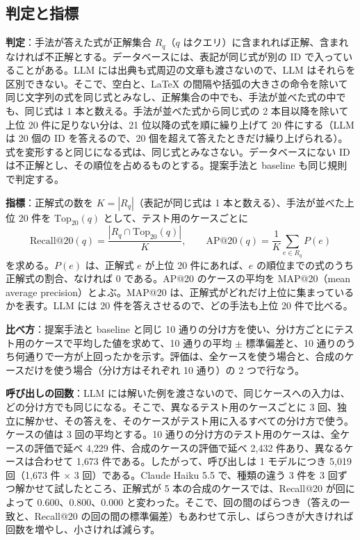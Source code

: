 \documentclass[a4j,dvipdfmx,10pt]{jresume}
\newcommand{\Top}{\mathrm{Top}}
\begin{document}
\subsection{判定と指標}
\textbf{判定}：手法が答えた式が正解集合 $R_q$（$q$ はクエリ）に含まれれば正解、含まれなければ不正解とする。データベースには、表記が同じ式が別の ID で入っていることがある。LLM には出典も式周辺の文章も渡さないので、LLM はそれらを区別できない。そこで、空白と、\LaTeX{} の間隔や括弧の大きさの命令を除いて同じ文字列の式を同じ式とみなし、正解集合の中でも、手法が並べた式の中でも、同じ式は 1 本と数える。手法が並べた式から同じ式の 2 本目以降を除いて上位 20 件に足りない分は、21 位以降の式を順に繰り上げて 20 件にする（LLM は 20 個の ID を答えるので、20 個を超えて答えたときだけ繰り上げられる）。式を変形すると同じになる式は、同じ式とみなさない。データベースにない ID は不正解とし、その順位を占めるものとする。提案手法と baseline も同じ規則で判定する。

\textbf{指標}：正解式の数を $K = |R_q|$（表記が同じ式は 1 本と数える）、手法が並べた上位 20 件を $\Top_{20}(q)$ として、テスト用のケースごとに
\begin{equation*}
  \mathrm{Recall@20}(q) = \frac{|R_q \cap \Top_{20}(q)|}{K}, \qquad
  \mathrm{AP@20}(q) = \frac{1}{K} \sum_{e \in R_q} P(e)
\end{equation*}
を求める。$P(e)$ は、正解式 $e$ が上位 20 件にあれば、$e$ の順位までの式のうち正解式の割合、なければ 0 である。AP@20 のケースの平均を MAP@20（mean average precision）とよぶ。MAP@20 は、正解式がどれだけ上位に集まっているかを表す。LLM には 20 件を答えさせるので、どの手法も上位 20 件で比べる。

\textbf{比べ方}：提案手法と baseline と同じ 10 通りの分け方を使い、分け方ごとにテスト用のケースで平均した値を求めて、10 通りの平均 $\pm$ 標準偏差と、10 通りのうち何通りで一方が上回ったかを示す。評価は、全ケースを使う場合と、合成のケースだけを使う場合（分け方はそれぞれ 10 通り）の 2 つで行なう。

\textbf{呼び出しの回数}：LLM には解いた例を渡さないので、同じケースへの入力は、どの分け方でも同じになる。そこで、異なるテスト用のケースごとに 3 回、独立に解かせ、その答えを、そのケースがテスト用に入るすべての分け方で使う。ケースの値は 3 回の平均とする。10 通りの分け方のテスト用のケースは、全ケースの評価で延べ 4{,}229 件、合成のケースの評価で延べ 2{,}432 件あり、異なるケースは合わせて 1{,}673 件である。したがって、呼び出しは 1 モデルにつき 5{,}019 回（1{,}673 件 $\times$ 3 回）である。Claude Haiku 5.5 で、種類の違う 3 件を 3 回ずつ解かせて試したところ、正解式が 5 本の合成のケースでは、Recall@20 が回によって 0.600、0.800、0.000 と変わった。そこで、回の間のばらつき（答えの一致と、Recall@20 の回の間の標準偏差）もあわせて示し、ばらつきが大きければ回数を増やし、小さければ減らす。
\end{document}
